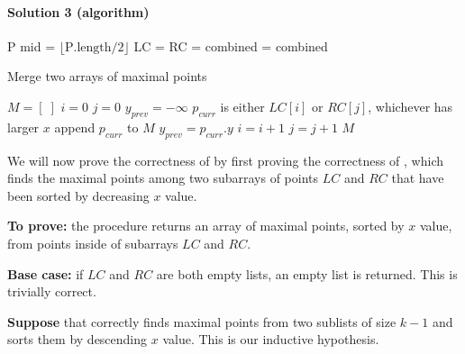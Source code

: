\documentclass[11pt]{article}
\begin{document}
\paragraph{Solution 3 (algorithm)}

\begin{algorithmic}[1]
            \State \Return P
        \EndIf
        \State mid = $ \lfloor \text{P.length} / 2 \rfloor $
        \State LC = 
        \State RC = 
        \State combined = 
        \State \Return combined
    \EndProcedure
\end{algorithmic}

\begin{algorithm}
\caption{Merge two arrays of maximal points}
\begin{algorithmic}[1]
    \State $M = [\;]$
    \State $i=0$
    \State $j=0$
    \State $y_{prev} = -\infty$
    \State $p_{curr}$ is either $LC[i]$ or $RC[j]$, whichever has larger $x$
        \State append $p_{curr}$ to $M$
        \State $y_{prev} = p_{curr}.y$
    \EndIf
        \State $i = i +1$
    \Else
        \State $j = j + 1$
    \EndIf
    \EndWhile
    \State \Return $M$
\EndProcedure
\end{algorithmic}
\end{algorithm}



We will now prove the correctness of  by first proving the
correctness of , which finds the maximal points among 
two subarrays of points $LC$ and $RC$ that have been sorted by decreasing
$x$ value.

\textbf{To prove:} the  procedure returns an array of
maximal points, sorted by $x$ value, from points inside of subarrays $LC$ and
$RC$.

\textbf{Base case:} if $LC$ and $RC$ are both empty lists, an empty list is
returned. This is trivially correct.

\textbf{Suppose} that  correctly finds maximal points
from two sublists of size $k-1$ and sorts them by descending $x$ value. This is our inductive hypothesis.
\end{document}
